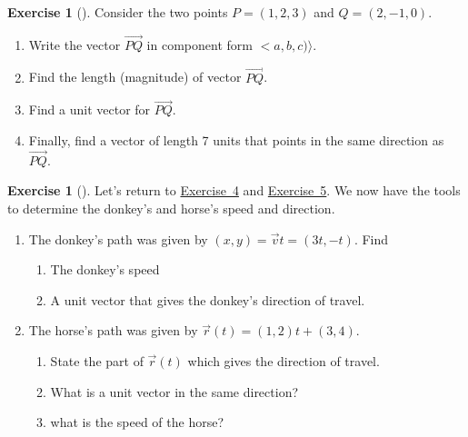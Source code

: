 \documentclass[10pt,]{book}
\theoremstyle{plain}
\theoremstyle{definition}
\theoremstyle{definition}
\theoremstyle{definition}
\theoremstyle{definition}
\newtheorem{exploration}[project]{Exercise}
\theoremstyle{definition}
\numberwithin{equation}{section}
\newcommand{\lt}{<}
\begin{document}
\begin{exploration}[]\label{exploration-25}
Consider the two points \(P=(1,2,3)\) and \(Q=(2,-1,0)\).%
\begin{enumerate}[font=\bfseries,label=(\alph*),ref=\alph*]
\item\label{task-46} Write the vector \(\vec {PQ}\) in component form \(\lt a,b,c)\rangle\).%
\item\label{task-47} Find the length (magnitude) of vector \(\vec {PQ}\).%
\item\label{task-48} Find a unit vector for \(\vec{PQ}\).%
\item\label{task-49} Finally, find a vector of length 7 units that points in the same direction as \(\vec{PQ}\).%
\end{enumerate}
\end{exploration}
\begin{exploration}[]\label{exploration-26}
Let's return to \hyperref[prob_donkey]{Exercise~4} and \hyperref[prob_horseline]{Exercise~5}. We now have the tools to determine the donkey's and horse's speed and direction.%
\begin{enumerate}[font=\bfseries,label=(\alph*),ref=\alph*]
\item\label{task-50} The donkey's path was given by \((x,y)=\vec v t = (3t,-t)\). Find%
\begin{enumerate}[font=\bfseries,label=(\roman*),ref=\theenumi.\roman*]
\item\label{task-51} The donkey's speed%
\item\label{task-52} A unit vector that gives the donkey's direction of travel.%
\end{enumerate}
\item\label{task-53} The horse's path was given by \(\vec r(t) = (1,2)t + (3,4)\).%
\begin{enumerate}[font=\bfseries,label=(\roman*),ref=\theenumi.\roman*]
\item\label{task-54} State the part of \(\vec r(t)\) which gives the direction of travel.%
\item\label{task-55} What is a unit vector in the same direction?%
\item\label{task-56} what is the speed of the horse?%
\end{enumerate}
\end{enumerate}
\end{exploration}
\typeout{************************************************}
\typeout{************************************************}
\end{document}
